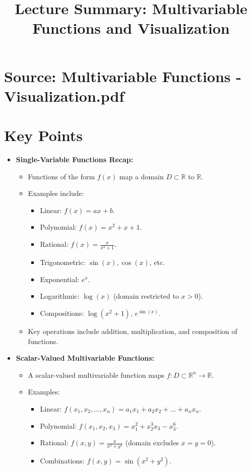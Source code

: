 \documentclass{article}
\title{Lecture Summary: Multivariable Functions and Visualization}
\author{}
\date{}
\begin{document}
\maketitle

\section*{Source: Multivariable Functions - Visualization.pdf}

\section*{Key Points}

\begin{itemize}
  \item \textbf{Single-Variable Functions Recap:}
    \begin{itemize}
      \item Functions of the form $f(x)$ map a domain $D \subset \mathbb{R}$ to $\mathbb{R}$.
      \item Examples include:
        \begin{itemize}
          \item Linear: $f(x) = ax + b$.
          \item Polynomial: $f(x) = x^2 + x + 1$.
          \item Rational: $f(x) = \frac{x}{x^2 + 1}$.
          \item Trigonometric: $\sin(x), \cos(x)$, etc.
          \item Exponential: $e^x$.
          \item Logarithmic: $\log(x)$ (domain restricted to $x > 0$).
          \item Compositions: $\log(x^2 + 1)$, $e^{\sin(x)}$.
        \end{itemize}
      \item Key operations include addition, multiplication, and composition of functions.
    \end{itemize}

  \item \textbf{Scalar-Valued Multivariable Functions:}
    \begin{itemize}
      \item A scalar-valued multivariable function maps $f: D \subset \mathbb{R}^n \to \mathbb{R}$.
      \item Examples:
        \begin{itemize}
          \item Linear: $f(x_1, x_2, \dots, x_n) = a_1 x_1 + a_2 x_2 + \dots + a_n x_n$.
          \item Polynomial: $f(x_1, x_2, x_3) = x_1^2 + x_2^3 x_3 - x_3^6$.
          \item Rational: $f(x, y) = \frac{x}{x^2 + y^2}$ (domain excludes $x = y = 0$).
          \item Combinations: $f(x, y) = \sin(x^2 + y^2)$.
        \end{itemize}
    \end{itemize}


\end{itemize}
\end{document}
